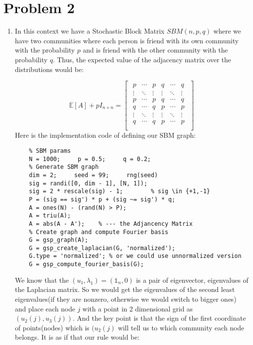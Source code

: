 \documentclass{article}
\begin{document}
\section*{Problem 2}
\begin{enumerate}
    \item In this context we have a Stochastic Block Matrix $SBM(n,p,q)$ where we have two communities where each person is friend with its own community with the probability $p$ and is friend with the other community with the probability $q$.
    Thus, the expected value of the adjacency matrix over the distributions would be:

    \[
    \mathbb{E } [A] + p I_{n\times  n} = 
    \begin{bmatrix}
    \begin{array}{ccc|ccc}
    p & \cdots & p & q & \cdots & q \\
    \vdots & \ddots & \vdots & \vdots & \ddots & \vdots \\
    p & \cdots & p & q & \cdots & q \\
    \hline
    q & \cdots & q & p & \cdots & p \\
    \vdots & \ddots & \vdots & \vdots & \ddots & \vdots \\
    q & \cdots & q & p & \cdots & p \\
    \end{array}
    \end{bmatrix}
    \]
    Here is the implementation code of defining our SBM graph:
    
    \begin{lstlisting}
    % SBM params
    N = 1000;     p = 0.5;     q = 0.2;
    % Generate SBM graph
    dim = 2;     seed = 99;     rng(seed)
    sig = randi([0, dim - 1], [N, 1]);
    sig = 2 * rescale(sig) - 1;        % sig \in {+1,-1}
    P = (sig == sig') * p + (sig ~= sig') * q;
    A = ones(N) - (rand(N) > P);
    A = triu(A);
    A = abs(A - A');    % --- the Adjancency Matrix 
    % Create graph and compute Fourier basis
    G = gsp_graph(A);
    G = gsp_create_laplacian(G, 'normalized');
    G.type = 'normalized'; % or we could use unnormalized version
    G = gsp_compute_fourier_basis(G);
    \end{lstlisting}
    
    We know that the $(u_1, \lambda_1) = (\mathbb{1}_n, 0)$ is a pair of eigenvector, eigenvalues of the Laplacian matrix. So we would get the eigenvalues of the second least eigenvalues(if they are nonzero, otherwise we  would switch to bigger ones)
    and place each node $j$ with a point in 2 dimensional grid as $(u_2 (j), u_3 (j))$. And the key point is that the sign of the first coordinate of points(nodes) which is $(u_2 (j)$ will tell us to which community each node belongs. It is as if that our rule would be:


\end{enumerate}
\end{document}
